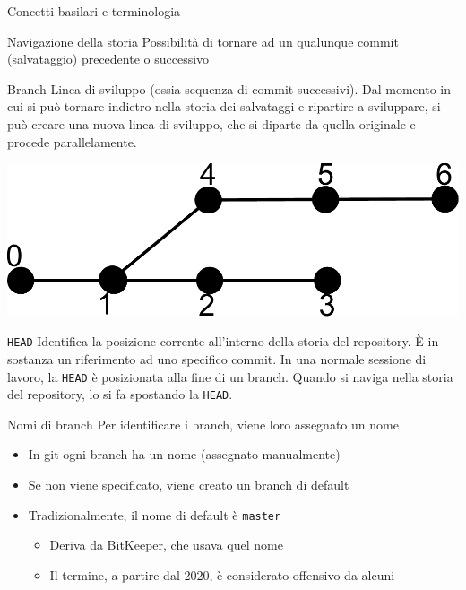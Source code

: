 \documentclass[xcolor=dvipsnames,presentation]{beamer}
\begin{document}
\begin{frame}[allowframebreaks]{Concetti basilari e terminologia}
    \begin{block}{Navigazione della storia}
        Possibilità di tornare ad un qualunque commit (salvataggio) precedente o successivo
    \end{block}
    \begin{block}{Branch}
        Linea di sviluppo (ossia sequenza di commit successivi). Dal momento in cui si può tornare indietro nella storia dei salvataggi e ripartire a sviluppare, si può creare una nuova linea di sviluppo, che si diparte da quella originale e procede parallelamente.
        \begin{center}
            \includegraphics[height=.4\textheight]{img/branch}
        \end{center}
    \end{block}
    \begin{block}{\texttt{HEAD}}
        Identifica la posizione corrente all'interno della storia del repository.
        È in sostanza un riferimento ad uno specifico commit.
        In una normale sessione di lavoro, la \texttt{HEAD} è posizionata alla fine di un branch.
        Quando si naviga nella storia del repository, lo si fa spostando la \texttt{HEAD}.
    \end{block}
    \begin{block}{Nomi di branch}
        Per identificare i branch, viene loro assegnato un nome
        \begin{itemize}
            \item In git ogni branch ha un nome (assegnato manualmente)
            \item Se non viene specificato, viene creato un branch di default
            \item Tradizionalmente, il nome di default è \texttt{master}
            \begin{itemize}
                \item Deriva da BitKeeper, che usava quel nome
                \item Il termine, a partire dal 2020, è considerato offensivo da alcuni

\end{itemize}
\end{itemize}
\end{block}
\end{frame}
\end{document}
